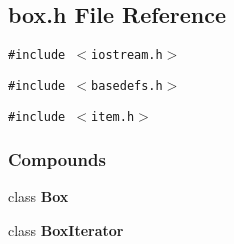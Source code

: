 \subsection{box.h File Reference}
\label{box.h}
{\tt \#include $<$iostream.h$>$}\par
{\tt \#include $<$basedefs.h$>$}\par
{\tt \#include $<$item.h$>$}\par
\subsubsection*{Compounds}
\begin{CompactItemize}
\item 
class {\bf Box}
\item 
class {\bf Box\-Iterator}
\end{CompactItemize}
